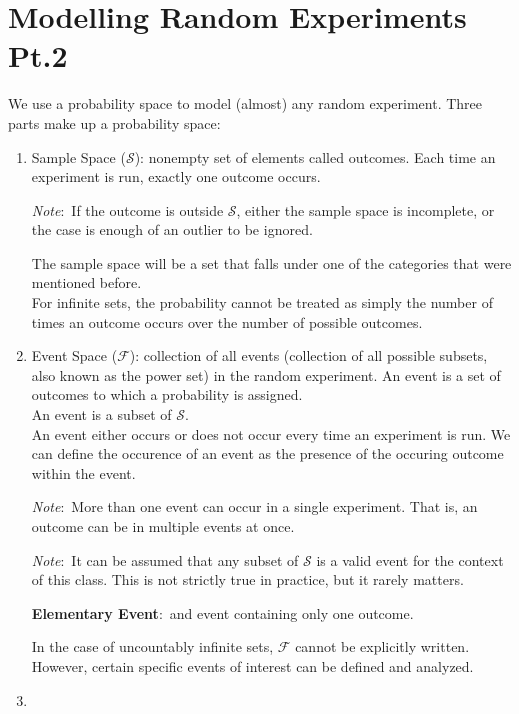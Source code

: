 \documentclass[nobib]{tufte-handout}
\newcommand{\defn}[2]{
        \begin{defbox}
        \noindent\textbf{#1}:\ #2
        \end{defbox}
}
\newcommand{\note}[1]{
        \begin{notebox}
        \noindent\textit{Note}:\ #1
        \end{notebox}
}
\newcommand{\sidenoteclass}[1]{
        \begin{sidenotebox}
        \noindent\textit{Sidenote}:\ #1
        \end{sidenotebox}
}
\begin{document}
\section{Modelling Random Experiments Pt.2}
We use a probability space to model (almost) any random experiment. Three parts
make up a probability space:
\begin{enumerate}
    \item Sample Space ($\mathcal{S}$): nonempty set of elements called outcomes. Each
          time an experiment is run, exactly one outcome occurs. \note{If the outcome is
              outside $\mathcal{S}$, either the sample space is incomplete, or the case is
              enough of an outlier to be ignored.} The sample space will be a set that falls
          under one of the categories that were mentioned before.\\ For infinite sets,
          the probability cannot be treated as simply the number of times an outcome
          occurs over the number of possible outcomes.
    \item Event Space ($\mathcal{F}$): collection of all events (collection of all possible subsets, also known as the power set) in the random experiment.
          An event is a set of outcomes to which a probability is assigned.\\ An event is
          a subset of $\mathcal{S}$.\\ An event either occurs or does not occur every time an experiment is run. We can define the occurence of an event as the presence of the occuring outcome within the event.
          \note{More than one event can occur in a single experiment. That is, an outcome can be in multiple events at once.}
          \note{It can be assumed that any subset of $\mathcal{S}$ is a valid event for the context of this class. This is not strictly true in practice, but it rarely matters.}
          \defn{Elementary Event}{and event containing only one outcome.}
          In the case of uncountably infinite sets, $\mathcal{F}$ cannot be explicitly written. However, certain specific events of interest can be defined and analyzed.
    \item 
\end{enumerate}
\end{document}
